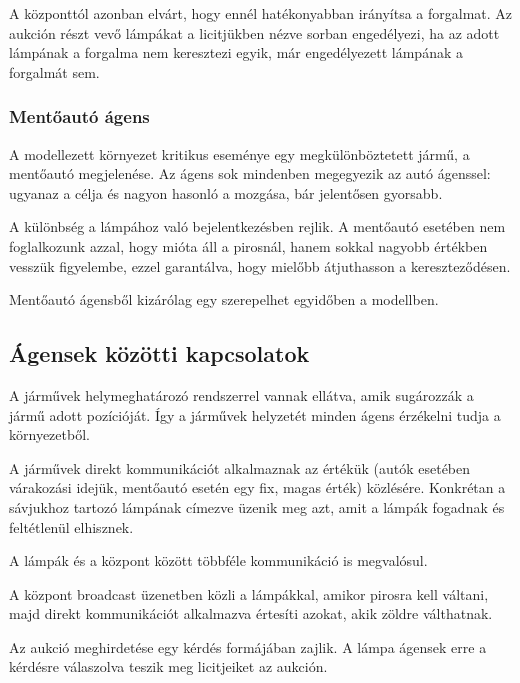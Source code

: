 \documentclass[a4paper, 11pt]{article}
\begin{document}
A központtól azonban elvárt, hogy ennél hatékonyabban irányítsa a forgalmat.
Az aukción részt vevő lámpákat a licitjükben nézve sorban engedélyezi, ha az adott lámpának a forgalma
nem keresztezi egyik, már engedélyezett lámpának a forgalmát sem.
\subsubsection{Mentőautó ágens}
A modellezett környezet kritikus eseménye egy megkülönböztetett jármű, a mentőautó megjelenése.
Az ágens sok mindenben megegyezik az autó ágenssel: ugyanaz a célja és nagyon hasonló a mozgása, bár jelentősen
gyorsabb.

A különbség a lámpához való bejelentkezésben rejlik. A mentőautó esetében nem foglalkozunk azzal,
hogy mióta áll a pirosnál, hanem sokkal nagyobb értékben vesszük figyelembe, ezzel garantálva, hogy mielőbb
átjuthasson a kereszteződésen.

Mentőautó ágensből kizárólag egy szerepelhet egyidőben a modellben.
\subsection{Ágensek közötti kapcsolatok}
A járművek helymeghatározó rendszerrel vannak ellátva, amik sugározzák a jármű adott pozícióját. Így
a járművek helyzetét minden ágens érzékelni tudja a környezetből.

A járművek direkt kommunikációt alkalmaznak az értékük (autók esetében várakozási idejük, mentőautó
esetén egy fix, magas érték) közlésére. Konkrétan a sávjukhoz tartozó lámpának címezve üzenik meg azt,
amit a lámpák fogadnak és feltétlenül elhisznek.

A lámpák és a központ között többféle kommunikáció is megvalósul.

A központ broadcast üzenetben közli a lámpákkal, amikor pirosra kell váltani, majd direkt
kommunikációt alkalmazva értesíti azokat, akik zöldre válthatnak.

Az aukció meghirdetése egy kérdés formájában zajlik. A lámpa ágensek erre a kérdésre válaszolva
teszik meg licitjeiket az aukción.
\end{document}
